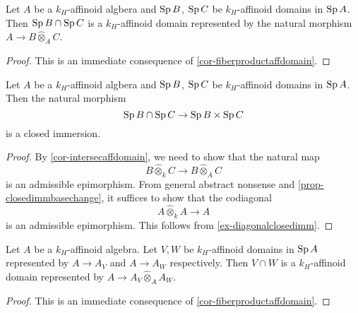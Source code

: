 \begin{corollary}\label{cor-intersecaffdomain}
    Let $A$ be a $k_H$-affinoid algbera and $\operatorname{Sp} B$, $\operatorname{Sp} C$ be $k_H$-affinoid domains in $\operatorname{Sp} A$. Then $\operatorname{Sp} B\cap \operatorname{Sp} C$ is a $k_H$-affinoid domain represented by the natural morphism $A\rightarrow B\hat{\otimes}_A C$.
\end{corollary}
\begin{proof}
    This is an immediate consequence of \cref{cor-fiberproductaffdomain}.
\end{proof}

\begin{corollary}\label{cor-spcatclosedimm}
    Let $A$ be a $k_H$-affinoid algbera and $\operatorname{Sp} B$, $\operatorname{Sp} C$ be $k_H$-affinoid domains in $\operatorname{Sp} A$. Then the natural morphism
    \[
        \operatorname{Sp} B\cap \operatorname{Sp} C\rightarrow \operatorname{Sp} B\times \operatorname{Sp} C  
    \]
    is a closed immersion.
\end{corollary}
\begin{proof}
    By \cref{cor-intersecaffdomain}, we need to show that the natural map
    \[
        B\hat{\otimes}_k C\rightarrow   B\hat{\otimes}_A C
    \]
    is an admissible epimorphism. From general abstract nonsense and \cref{prop-closedimmbasechange}, it suffices to show that the codiagonal 
    \[
        A\hat{\otimes}_k A\rightarrow A  
    \]is 
    an admissible epimorphism. This follows from \cref{ex-diagonalclosedimm}.
\end{proof}

\begin{corollary}\label{cor-affdomainquotient}
    Let $A$ be a $k_H$-affinoid algebra. Let $V,W$ be $k_H$-affinoid domains in $\operatorname{Sp} A$ represented by $A\rightarrow A_V$ and $A\rightarrow A_W$ respectively. Then $V\cap W$ is a $k_H$-affinoid domain represented by $A\rightarrow A_V\hat{\otimes}_A A_W$.
\end{corollary}
\begin{proof}
    This is an immediate consequence of \cref{cor-fiberproductaffdomain}.
    \iffalse
    Observe that $A_V\hat{\otimes}_A A_W$ is $k_H$-affinoid by \cref{prop-existfiberprod}.
    We verify the universal property: let $\Sp B\rightarrow \Sp A$ be a morphism that factors through $V\cap W$, then from the universal properties of $V$ and $W$, we find morphisms $A_V\rightarrow B$ and $A_W\rightarrow B$, both being $A$-linear. So we obtain an induced morphism $A_V\hat{\otimes}_A A_W\rightarrow B$. The morphism is clearly unique.
\fi
\end{proof}


